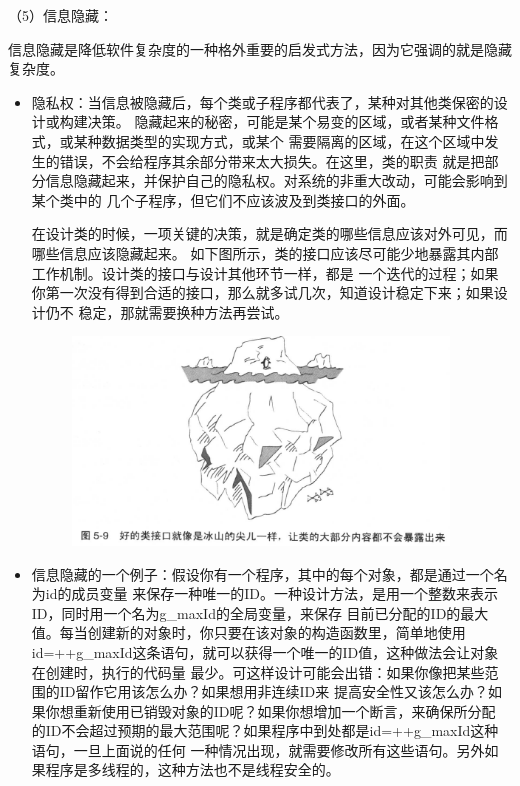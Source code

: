 \documentclass{article}
\begin{document}
\par
（5）信息隐藏：
\par
信息隐藏是降低软件复杂度的一种格外重要的启发式方法，因为它强调的就是隐藏复杂度。
\begin{itemize}
    \item 隐私权：当信息被隐藏后，每个类或子程序都代表了，某种对其他类保密的设计或构建决策。
    隐藏起来的秘密，可能是某个易变的区域，或者某种文件格式，或某种数据类型的实现方式，或某个
    需要隔离的区域，在这个区域中发生的错误，不会给程序其余部分带来太大损失。在这里，类的职责
    就是把部分信息隐藏起来，并保护自己的隐私权。对系统的非重大改动，可能会影响到某个类中的
    几个子程序，但它们不应该波及到类接口的外面。
    \par
    在设计类的时候，一项关键的决策，就是确定类的哪些信息应该对外可见，而哪些信息应该隐藏起来。
    如下图所示，类的接口应该尽可能少地暴露其内部工作机制。设计类的接口与设计其他环节一样，都是
    一个迭代的过程；如果你第一次没有得到合适的接口，那么就多试几次，知道设计稳定下来；如果设计仍不
    稳定，那就需要换种方法再尝试。
    \begin{figure}[ht]
        \centering
        \includegraphics[width=10cm]{figure8.png}
    \end{figure}
    \item 信息隐藏的一个例子：假设你有一个程序，其中的每个对象，都是通过一个名为id的成员变量
    来保存一种唯一的ID。一种设计方法，是用一个整数来表示ID，同时用一个名为g\_maxId的全局变量，来保存
    目前已分配的ID的最大值。每当创建新的对象时，你只要在该对象的构造函数里，简单地使用
    id=++g\_maxId这条语句，就可以获得一个唯一的ID值，这种做法会让对象在创建时，执行的代码量
    最少。可这样设计可能会出错：如果你像把某些范围的ID留作它用该怎么办？如果想用非连续ID来
    提高安全性又该怎么办？如果你想重新使用已销毁对象的ID呢？如果你想增加一个断言，来确保所分配
    的ID不会超过预期的最大范围呢？如果程序中到处都是id=++g\_maxId这种语句，一旦上面说的任何
    一种情况出现，就需要修改所有这些语句。另外如果程序是多线程的，这种方法也不是线程安全的。

\end{itemize}
\end{document}
